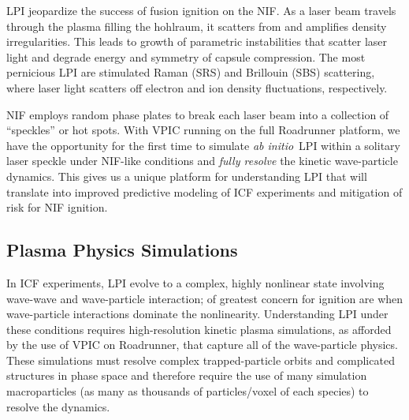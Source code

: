 \documentclass[letter,10pt]{article}
\newcommand{\abinitio} {\textit{ab initio}}
\begin{document}
LPI jeopardize the success of fusion ignition on the NIF.  As a laser
beam travels through the plasma filling the hohlraum, it scatters from
and amplifies density irregularities.  This leads to growth of
parametric instabilities that scatter laser light and degrade energy
and symmetry of capsule compression.  The most pernicious LPI are
stimulated Raman (SRS) and Brillouin (SBS) scattering, where laser
light scatters off electron and ion density fluctuations,
respectively.

NIF employs random phase plates to break each laser beam into a
collection of ``speckles'' or hot spots.  
With VPIC running on the full
Roadrunner platform, we have the opportunity for the first time to
simulate \abinitio\ LPI within a solitary laser speckle under NIF-like
conditions and \textit{fully resolve} the kinetic wave-particle
dynamics.  This gives us a unique platform for understanding LPI that
will translate into improved predictive modeling of ICF experiments
and mitigation of risk for NIF ignition.

\subsection{Plasma Physics Simulations}

In ICF experiments, LPI evolve to a complex, highly nonlinear state
involving wave-wave and wave-particle interaction; of greatest concern
for ignition are when wave-particle interactions dominate the
nonlinearity.  Understanding LPI under these conditions requires
high-resolution kinetic plasma simulations, as afforded by the use of
VPIC on Roadrunner, that capture all of the wave-particle physics.
These simulations must resolve complex trapped-particle orbits and
complicated structures in phase space and therefore require the use of
many simulation macroparticles (as many as thousands of
particles/voxel of each species) to resolve the
dynamics.~\cite{Yin_et_al_Phys_Plasmas_2006}
\end{document}
